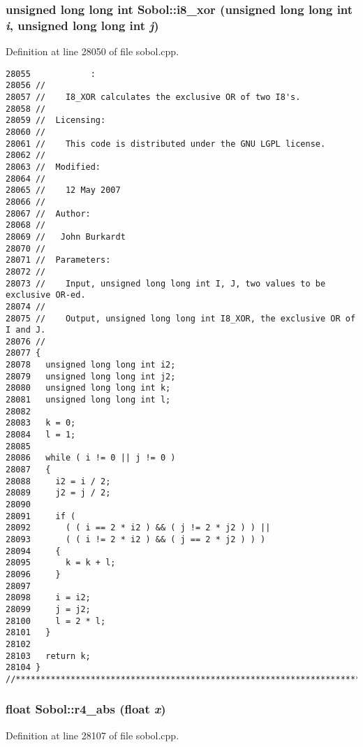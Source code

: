 \subsubsection{\setlength{\rightskip}{0pt plus 5cm}unsigned long long int Sobol::i8\_\-xor (unsigned long long int {\em i}, unsigned long long int {\em j})}\label{namespaceSobol_61091b24c854aa21d883fa318c21160c}




Definition at line 28050 of file sobol.cpp.

\begin{Code}\begin{verbatim}28055            :
28056 //
28057 //    I8_XOR calculates the exclusive OR of two I8's.
28058 //
28059 //  Licensing:
28060 //
28061 //    This code is distributed under the GNU LGPL license. 
28062 //
28063 //  Modified:
28064 //
28065 //    12 May 2007
28066 //
28067 //  Author:
28068 //
28069 //   John Burkardt
28070 //
28071 //  Parameters:
28072 //
28073 //    Input, unsigned long long int I, J, two values to be exclusive OR-ed.
28074 //
28075 //    Output, unsigned long long int I8_XOR, the exclusive OR of I and J.
28076 //
28077 {
28078   unsigned long long int i2;
28079   unsigned long long int j2;
28080   unsigned long long int k;
28081   unsigned long long int l;
28082 
28083   k = 0;
28084   l = 1;
28085 
28086   while ( i != 0 || j != 0 )
28087   {
28088     i2 = i / 2;
28089     j2 = j / 2;
28090 
28091     if ( 
28092       ( ( i == 2 * i2 ) && ( j != 2 * j2 ) ) ||
28093       ( ( i != 2 * i2 ) && ( j == 2 * j2 ) ) )
28094     {
28095       k = k + l;
28096     }
28097 
28098     i = i2;
28099     j = j2;
28100     l = 2 * l;
28101   }
28102 
28103   return k;
28104 }
//****************************************************************************80
\end{verbatim}
\end{Code}


\subsubsection{\setlength{\rightskip}{0pt plus 5cm}float Sobol::r4\_\-abs (float {\em x})}\label{namespaceSobol_1697cdd7d9de22a1266425ebf5cf1ee7}




Definition at line 28107 of file sobol.cpp.

